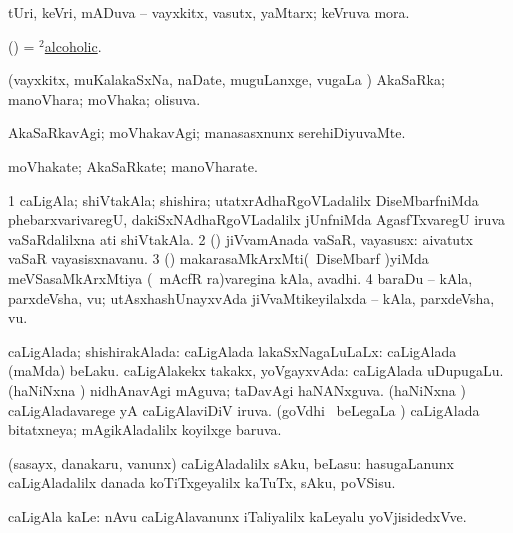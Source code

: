 \bentry
{}
\gl{\nA}
\bmng
tUri, keVri, mADuva -- vayxkitx, vasutx, yaMtarx; keVruva mora. 
\emng
\eentry

\bentry
{}
\gl{\nA} 
\bmng
(\ashi) = \hyperref{kandict_a.pdf}{A}{alcoholic(2)}{$^2$alcoholic}. 
\emng
\eentry

\bentry
{}
\gl{\gu}
\bmng
(vayxkitx, muKalakaSxNa, naDate, muguLanxge, \mo vugaLa \vi) AkaSaRka; manoVhara; moVhaka; olisuva. 
\emng
\eentry

\bentry
{}
\gl{\kirxvi}
\bmng
AkaSaRkavAgi; moVhakavAgi; manasasxnunx serehiDiyuvaMte. 
\emng
\eentry

\bentry
{}
\gl{\nA}
\bmng
moVhakate; AkaSaRkate; manoVharate. 
\emng
\eentry

\bentry
{} 
\gl{\nA}
\expl{}
\bmng
\bnum
\num{1} caLigAla; shiVtakAla; shishira; utatxrAdhaRgoVLadalilx DiseMbarfniMda phebarxvarivaregU, dakiSxNAdhaRgoVLadalilx jUnfniMda AgasfTxvaregU iruva vaSaRdalilxna ati shiVtakAla. 
\num{2} (\kAparx) jiVvamAnada vaSaR, vayasusx:  aivatutx vaSaR vayasisxnavanu. 
\num{3} (\Kavi) makarasaMkArxMti(\su\ DiseMbarf )yiMda meVSasaMkArxMtiya (\su\ mAcfR ra)varegina kAla, avadhi. 
\num{4} baraDu -- kAla, parxdeVsha, \mo vu; utAsxhashUnayxvAda jiVvaMtikeyilalxda -- kAla, parxdeVsha, \mo vu. 
\enum
\emng
\eentry

\bentry
{} 
\gl{\gu}
\bmng
caLigAlada; shishirakAlada: 
\banum
{} caLigAlada lakaSxNagaLuLaLx:  caLigAlada (maMda) beLaku. 
 caLigAlakekx takakx, yoVgayxvAda:  caLigAlada uDupugaLu. 
 (haNiNxna \vi) nidhAnavAgi mAguva; taDavAgi haNANxguva. 
 (haNiNxna \vi) caLigAladavarege yA caLigAlaviDiV iruva. 
 (goVdhi \mo\ beLegaLa \vi) caLigAlada bitatxneya; mAgikAladalilx koyilxge baruva. 
\eanum
\emng
\eentry

\bentry
{} 
\gl{\sakirx}
\bmng
(sasayx, danakaru, \mo vanunx) caLigAladalilx sAku, beLasu:  hasugaLanunx caLigAladalilx danada koTiTxgeyalilx kaTuTx, sAku, poVSisu. 
\emng

\noindent
\gl{\akirx}
\bmng
caLigAla kaLe:  nAvu caLigAlavanunx iTaliyalilx kaLeyalu yoVjisidedxVve. 
\emng
\eentry


